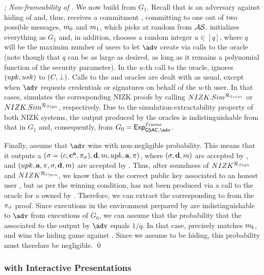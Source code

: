 \begin{proof}[; Non-frameability of \GSACGen]
  We now build \advB from $G_1$. Recall that \advB is an adversary against
  hiding of \C and, thus, receives a commitment \Ccom, committing to one out
  of two possible messages, $m_0$ and $m_1$, which \advB picks at random
  from $\mathcal{AS}$. \advB initializes everything as $G_1$ and, in addition,
  chooses a random integer $u \in [q]$, where $q$ will be the maximim number of
  users to let $\adv$ create via calls to the \HUGEN oracle (note though that
  $q$ can be as large as desired, as long as it remains a polynomial function of
  the security parameter). In the $u$-th call to the \HUGEN oracle, \advB
  ignores $(upk,usk)$ to $(C,\bot)$. Calls to the \OBTAIN and \SIGN oracles
  are dealt with as usual, except when $\adv$ requests credentials or signatures
  on behalf of the $u$-th user. In that cases, \advB simulates the corresponding
  NIZK proofs by calling $NIZK.Sim^{\mathcal{R}_{Issue}}$ or
  $NIZK.Sim^{\mathcal{R}_{Sign}}$, respectively. Due to the
  simulation-extractability property of both NIZK systems, the output produced
  by the oracles is indistinguishable from that in $G_1$ and, consequently, from
  $G_0=\ExpGSACNonframe$.

  Finally, assume that $\adv$ wins \ExpGSACNonframe with non-negligible
  probability. This means that it outputs a $(\sigma = (c,\mathbf{c}^{\mathbf{a}},
  \pi_\sigma),\mathbf{d},m,upk,\mathbf{a},\pi)$, where $(\sigma,\mathbf{d},m)$ are
  accepted by \Verify, and $(upk,\mathbf{a},\pi,\sigma,\mathbf{d},m)$ are
  accepted by \Judge. Thus, after soundness
  of $NIZK^{\mathcal{R}_{Sign}}$ and $NIZK^{\mathcal{R}_{Open}}$, we know that
  \upk is the correct public key associated to an honest user \uid, but as per
  the winning condition, \sig has not been produced via a call to the \SIGN
  oracle for a \cid owned by \uid. Therefore, we can extract the \usk
  corresponding to \upk from the $\pi_{\sigma}$ proof. Since executions in the
  environment prepared by \advB are indistinguishable to $\adv$ from executions
  of $G_0$, we can assume that the probability that the \uid associated to the
  \sig output by $\adv$ equals $1/q$. In that case, \usk precisely matches
  $m_b$, and \advB wins the hiding game against \C. Since we assume \C
  to be hiding, this probability must therefore be negligible.   
  \qed
\end{proof}

\subsubsection{\GSAC with Interactive Presentations}
\label{ssap:interactive-gsac}

